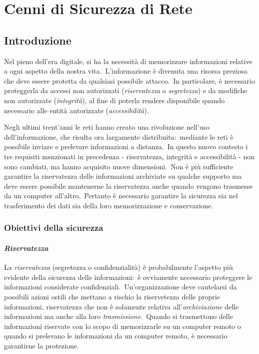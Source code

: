 \chapter{Cenni di Sicurezza di Rete}

\section{Introduzione}

Nel pieno dell'era digitale, si ha la necessità di memorizzare informazioni relative a ogni aspetto della nostra vita.\
L'informazione è divenuta una risorsa preziosa che deve essere protetta da qualsiasi possibile attacco.\
In particolare, è necessario proteggerla da accessi non autorizzati (\emph{riservatezza} o \emph{segretezza}) e da modifiche non autorizzate (\emph{integrità}), al fine di poterla rendere disponibile quando necessario alle entità autorizzate (\emph{accessibilità}).

Negli ultimi trent'anni le reti hanno creato una rivoluzione nell'uso dell'informazione, che risulta ora largamente distribuita:\ mediante le reti è possibile inviare e prelevare informazioni a distanza.\
In questo nuovo contesto i tre requisiti menzionati in precedenza - riservatezza, integrità e accessibilità - non sono cambiati, ma hanno acquisito nuove dimensioni.\
Non è più sufficiente garantire la riservatezza delle informazioni archiviate su qualche supporto ma deve essere possibile mantenerne la riservatezza anche quando vengono trasmesse da un computer all'altro.\
Pertanto è necessario garantire la sicurezza sia nel trasferimento dei dati sia della loro memorizzazione e conservazione.

\subsection{Obiettivi della sicurezza}

\subsubsection{\emph{Riservatezza}}

La \textit{riservatezza} (segretezza o confidenzialità) è probabilmente l'aspetto più evidente della sicurezza delle informazioni:\ è ovviamente necessario proteggere le informazioni considerate confidenziali.\
Un'organizzazione deve cautelarsi da possibili azioni ostili che mettano a rischio la riservetezza delle proprie informazioni, riservatezza che non è solamente relativa all'\textit{archiviazione} delle informazioni ma anche alla loro \textit{trasmissione}.\
Quando si trasmettono delle informazioni riservate con lo scopo di memorizzarle su un computer remoto o quando si prelevano le informazioni da un computer remoto, è necessario garantirne la protezione.

